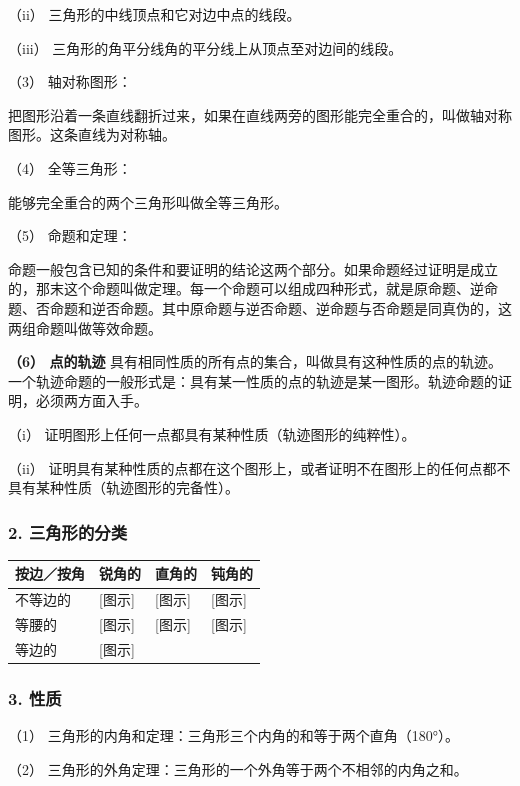 （ii） 三角形的中线顶点和它对边中点的线段。

（iii） 三角形的角平分线角的平分线上从顶点至对边间的线段。

（3） 轴对称图形：

把图形沿着一条直线翻折过来，如果在直线两旁的图形能完全重合的，叫做轴对称图形。这条直线为对称轴。

（4） 全等三角形：

能够完全重合的两个三角形叫做全等三角形。

（5） 命题和定理：

命题一般包含已知的条件和要证明的结论这两个部分。如果命题经过证明是成立的，那末这个命题叫做定理。每一个命题可以组成四种形式，就是原命题、逆命题、否命题和逆否命题。其中原命题与逆否命题、逆命题与否命题是同真伪的，这两组命题叫做等效命题。

\textbf{（6） 点的轨迹}
具有相同性质的所有点的集合，叫做具有这种性质的点的轨迹。一个轨迹命题的一般形式是：具有某一性质的点的轨迹是某一图形。轨迹命题的证明，必须两方面入手。

（i） 证明图形上任何一点都具有某种性质（轨迹图形的纯粹性）。

（ii）
证明具有某种性质的点都在这个图形上，或者证明不在图形上的任何点都不具有某种性质（轨迹图形的完备性）。

\subsubsection{2.
三角形的分类}

{\def\LTcaptype{none} %
\begin{longtable}[]{@{}llll@{}}
\toprule\noalign{}
按边／按角 & 锐角的 & 直角的 & 钝角的 \\
\midrule\noalign{}
\endhead
\bottomrule\noalign{}
\endlastfoot
不等边的 & {[}图示{]} & {[}图示{]} & {[}图示{]} \\
等腰的 & {[}图示{]} & {[}图示{]} & {[}图示{]} \\
等边的 & {[}图示{]} & & \\
\end{longtable}
}

\subsubsection{3. 性质}

（1） 三角形的内角和定理：三角形三个内角的和等于两个直角（180°）。

（2） 三角形的外角定理：三角形的一个外角等于两个不相邻的内角之和。


